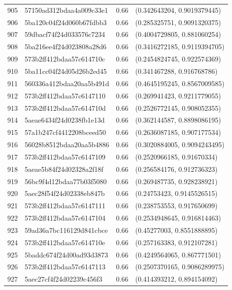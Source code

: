 \begin{table}[ht]
\begin{tabular}{rlrl}
  905 & 57150ad312bdaa4a009c33e1 & 0.66 & (0.342643204, 0.9019379445) \\ 
  906 & 5ba120c04f24d060b67fdbb3 & 0.66 & (0.285325751, 0.9091320375) \\ 
  907 & 59dbacf74f24d033576c7234 & 0.66 & (0.4004729805, 0.881060254) \\ 
  908 & 5ba216ee4f24d023808a28d6 & 0.66 & (0.3416272185, 0.9119394705) \\ 
  909 & 573b2ff412bdaa57c614710c & 0.66 & (0.2454824745, 0.922574369) \\ 
  910 & 5ba11cc04f24d05d26b2ed45 & 0.66 & (0.341467288, 0.916768786) \\ 
  911 & 560336a412bdaa20aa5b491d & 0.66 & (0.4645195245, 0.8567009585) \\ 
  912 & 573b2ff412bdaa57c6147110 & 0.66 & (0.269941423, 0.9211779055) \\ 
  913 & 573b2ff412bdaa57c614710d & 0.66 & (0.2526772145, 0.908052355) \\ 
  914 & 5aeae6434f24d0238fb1e13d & 0.66 & (0.362144587, 0.8898086195) \\ 
  915 & 57a1b247cf4412208bceed50 & 0.66 & (0.2636087185, 0.907177534) \\ 
  916 & 56028b8512bdaa20aa5b4886 & 0.66 & (0.3020884005, 0.9094243495) \\ 
  917 & 573b2ff412bdaa57c6147109 & 0.66 & (0.2520966185, 0.91670334) \\ 
  918 & 5aeae5b84f24d02328a2f18f & 0.66 & (0.256584176, 0.912736323) \\ 
  919 & 56bc9f4d12bdaa77b03f5080 & 0.66 & (0.269487735, 0.928238921) \\ 
  920 & 5aec28f54f24d02338eb847b & 0.66 & (0.24753423, 0.9145526515) \\ 
  921 & 573b2ff412bdaa57c6147111 & 0.66 & (0.238753553, 0.917650699) \\ 
  922 & 573b2ff412bdaa57c6147104 & 0.66 & (0.2534948645, 0.916814463) \\ 
  923 & 59ad36a7bc116129d841cbce & 0.66 & (0.45277003, 0.8551888895) \\ 
  924 & 573b2ff412bdaa57c614710e & 0.66 & (0.257163383, 0.912107281) \\ 
  925 & 5baddc674f24d00ad93d3873 & 0.66 & (0.4249564065, 0.867771501) \\ 
  926 & 573b2ff412bdaa57c6147113 & 0.66 & (0.2507370165, 0.9086289975) \\ 
  927 & 5aec27cf4f24d02239c456f3 & 0.66 & (0.414393212, 0.894154092) \\ 

\end{tabular}
\end{table}
